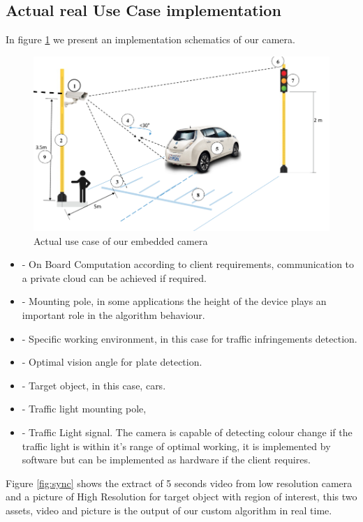 \subsection{Actual real Use Case implementation}

In figure \ref{fig:work_dec} we present an implementation schematics of our camera.

\begin{figure}[t]\centering
	\includegraphics[width=\linewidth]{images/lucam}
	\caption{Actual use case of our embedded camera}
	\label{fig:work_dec}
\end{figure}

\begin{itemize}[noitemsep] %

\item[1]- On Board Computation according to client requirements, communication to a private cloud can be achieved if required.
\item[2]- Mounting pole, in some applications the height of the device plays an important role in the algorithm behaviour.
\item[3-8]- Specific working environment, in this case for traffic infringements detection.
\item[4]- Optimal vision angle for plate detection.
\item[5]- Target object, in this case, cars.
\item[6]- Traffic light mounting pole,
\item[7]- Traffic Light signal. The camera is capable of detecting colour change if the traffic light is within it's range of optimal working, it is implemented by software but can be implemented as hardware if the client requires.
\end{itemize}
Figure \ref{fig:sync} shows the extract of 5 seconds video from low resolution camera and a picture of High Resolution for target object with region of interest, this two assets, video and picture is the output of our custom algorithm in real time.

